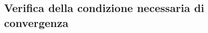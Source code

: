 \subsection{Verifica della condizione necessaria di convergenza}
\label{sec:esercizi-serie-condizione-necessaria}
